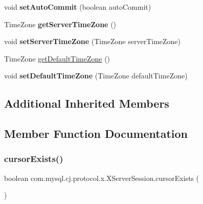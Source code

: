 \begin{DoxyCompactItemize}
void {\bfseries set\+Auto\+Commit} (boolean auto\+Commit)
\item 
\mbox{\label{classcom_1_1mysql_1_1cj_1_1protocol_1_1x_1_1_x_server_session_a1cfb3ee1396e5a92fea06afdf6a24944}} 
Time\+Zone {\bfseries get\+Server\+Time\+Zone} ()
\item 
\mbox{\label{classcom_1_1mysql_1_1cj_1_1protocol_1_1x_1_1_x_server_session_af6cfe7212e12090456729683e3ba9bdb}} 
void {\bfseries set\+Server\+Time\+Zone} (Time\+Zone server\+Time\+Zone)
\item 
Time\+Zone \mbox{\hyperlink{classcom_1_1mysql_1_1cj_1_1protocol_1_1x_1_1_x_server_session_aacde6eddcc1fd40cc726095f2f2d6b44}{get\+Default\+Time\+Zone}} ()
\item 
\mbox{\label{classcom_1_1mysql_1_1cj_1_1protocol_1_1x_1_1_x_server_session_a10e130d79476b1e117a213ee9014c877}} 
void {\bfseries set\+Default\+Time\+Zone} (Time\+Zone default\+Time\+Zone)
\end{DoxyCompactItemize}
\subsection*{Additional Inherited Members}


\subsection{Member Function Documentation}
\mbox{\label{classcom_1_1mysql_1_1cj_1_1protocol_1_1x_1_1_x_server_session_a4631fd33459ee83b06f167ba96e9218a}} 
\subsubsection{\texorpdfstring{cursor\+Exists()}{cursorExists()}}
{\footnotesize\ttfamily boolean com.\+mysql.\+cj.\+protocol.\+x.\+X\+Server\+Session.\+cursor\+Exists (\begin{DoxyParamCaption}{ }\end{DoxyParamCaption})}

